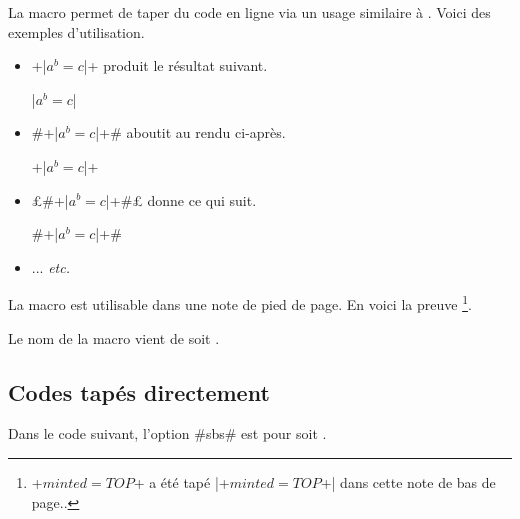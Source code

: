 \documentclass[12pt, a4paper]{article}
\begin{document}
La macro  permet de taper du code en ligne via un usage similaire à .
Voici des exemples d'utilisation.
\begin{itemize}
    \item \bdocinlatex+\bdocinlatex|$a^b = c$|+
          produit le résultat suivant.

          \bdocinlatex|$a^b = c$|

    \item \bdocinlatex#\bdocinlatex+\bdocinlatex|$a^b = c$|+#
          aboutit au rendu ci-après.

          \bdocinlatex+\bdocinlatex|$a^b = c$|+

    \item \bdocinlatex£\bdocinlatex#\bdocinlatex+\bdocinlatex|$a^b = c$|+#£
          donne ce qui suit.

          \bdocinlatex#\bdocinlatex+\bdocinlatex|$a^b = c$|+#

    \item ... \emph{etc.}
\end{itemize}


\begin{bdocimportant}
    La macro  est utilisable dans une note de pied de page. En voici la preuve
    \footnote{
        \bdocinlatex+$minted = TOP$+ a été tapé \bdocinlatex|\bdocinlatex+$minted = TOP$+| dans cette note de bas de page..
    }.
\end{bdocimportant}


\begin{bdocrem}
    Le nom de la macro  vient de  soit .
\end{bdocrem}




\subsection{Codes tapés directement}

\begin{bdocexa}
    Dans le code suivant, l'option \bdocinlatex#sbs# est pour  soit .

\end{bdocexa}


\end{document}
